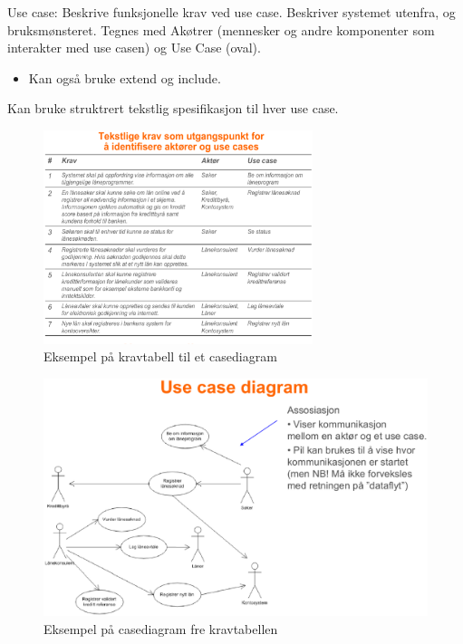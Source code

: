 \documentclass[11pt]{article}
\begin{document}
    Use case: Beskrive funksjonelle krav ved use case. Beskriver systemet utenfra, og bruksmønsteret. 
    Tegnes med Akøtrer (mennesker og andre komponenter som interakter med use casen) og Use Case (oval).
\begin{itemize}
\item Kan også bruke \label{extend}extend og \label{include}include.
\end{itemize}
    Kan bruke struktrert tekstlig spesifikasjon til hver use case.

    \begin{figure}[htb]
    \centering
    \includegraphics[width=0.7\textwidth]{./krav.eps}
    \caption{\label{fig:krav}Eksempel på kravtabell til et casediagram}
    \end{figure}
    \begin{figure}[htb]
    \centering
    \includegraphics[width=\textwidth]{./case.eps}
    \caption{\label{fig:case}Eksempel på casediagram fre kravtabellen}
    \end{figure}
\end{document}
